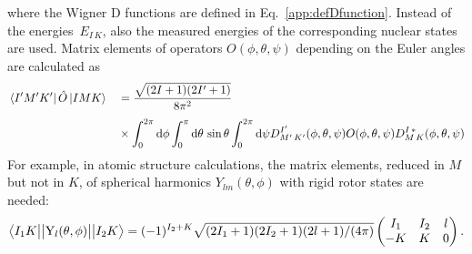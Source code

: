 where the Wigner D functions are defined in Eq.~\eqref{app:defDfunction}. 
Instead of the energies~$E_{I\,K}$, also the measured energies of the corresponding nuclear states~\cite{ENSDF} are used. Matrix elements of operators $O(\phi,\theta,\psi)$ depending on the Euler angles are calculated as
\begin{alignat}{2}
&\left< I^{\prime}M^{\prime}K^{\prime} \right|\hat{O}\left|IMK\right>&&=\frac{\sqrt{(2I+1)(2I^{\prime}+1)}}{8\pi^2}\\[4pt]
&
&&\times
\int_0^{2\pi}\text{d}\phi \int_0^{\pi}\text{d}\theta\,\sin\theta \int_0^{2\pi}\text{d}\psi
D^{I^{\prime}}_{M^{\prime}\,K^{\prime}}(\phi,\theta,\psi)O(\phi,\theta,\psi) D^{I\,*}_{M\,K}(\phi,\theta,\psi)\notag
\end{alignat}
For example, in atomic structure calculations, the matrix elements, reduced in $M$ but not in $K$, of spherical harmonics $Y_{lm}(\theta,\phi)$ with rigid rotor states are needed:
\begin{align}
\left< I_1K\big{|}\big{|}\text{Y}_l(\theta,\phi)\big{|}\big{|}I_2K\right>=(-1)^{I_2+K}
\sqrt{(2I_1+1)(2I_2+1)(2l+1)/(4\pi)}
\left(
\begin{matrix}
I_1&I_2&l\\
-K&K&0
\end{matrix}
\right).\notag\\
\phantom{1}\label{eq:rigidRotRedElement} 
\end{align}







